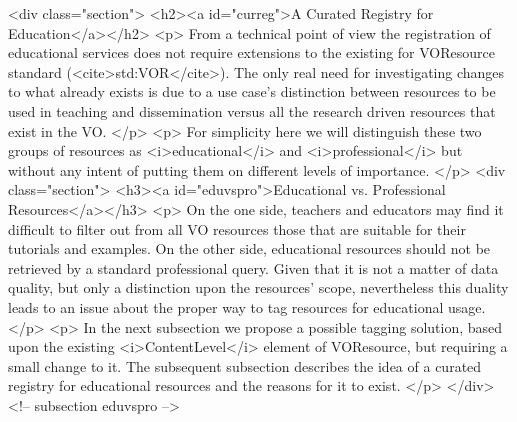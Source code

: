 <div class="section">
<h2><a id="curreg">A Curated Registry for Education</a></h2>
<p>
From a technical point of view the registration of educational services
does not require extensions
to the existing for VOResource standard (<cite>std:VOR</cite>).
The only real need for investigating changes to what already exists is due to a
use case's distinction between resources to be used in teaching and dissemination
versus all the research driven resources that exist in the VO.
</p>
<p>
For simplicity here we will distinguish these two groups of resources as
<i>educational</i> and <i>professional</i> but without any intent of putting them
on different levels of importance.
</p>
<div class="section">
  <h3><a id="eduvspro">Educational vs. Professional Resources</a></h3>
  <p>
  On the one side, teachers and educators may find it difficult to filter out 
  from all VO resources those that are suitable for their tutorials and
  examples. On the other side, educational resources should not be retrieved 
  by a standard professional query.
  Given that it is not a matter of data quality, but only a distinction upon 
  the resources' scope, nevertheless this duality leads to an issue about the
  proper way to tag resources for educational usage.
  </p>
  <p>
  In the next subsection we propose a possible tagging solution, based upon 
  the existing <i>ContentLevel</i> element of VOResource, but requiring a small change
  to it. The subsequent subsection describes the idea of a
  curated registry for educational resources and the reasons for it to exist.
  </p>
</div> <!-- subsection eduvspro -->

